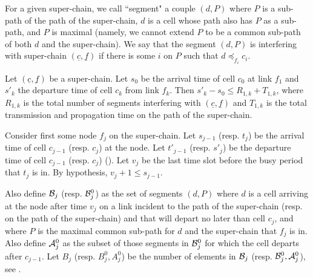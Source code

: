 \begin{definition}
For a given super-chain, we call ``segment" a couple $(d, P)$
where $P$ is a sub-path of the path of the super-chain, $d$ is a
cell whose path also has $P$ as a sub-path, and $P$ is maximal
(namely, we cannot extend $P$ to be a common sub-path of both $d$
and the super-chain). We say that the segment $(d,P)$ is
interfering with super-chain $(\underline{c},\underline{f})$ if
there is some $i$ on $P$ such that $d \preccurlyeq_{f_i} c_i$.
\end{definition}
\begin{lemma}
  Let $(\underline{c}, \underline{f})$ be
a super-chain. Let $s_0$ be the arrival time of cell $c_0$ at link
$f_1$ and  $s'_k$ the departure time of cell $c_k$ from link
$f_k$. Then $s'_k-s_0 \leq R_{1,k}+T_{1, k}$, where $R_{1,k}$ is
the total number of segments interfering with $(\underline{c},
\underline{f})$ and $T_{1, k}$ is the total transmission and
propagation time on the path of the super-chain.
\end{lemma}
\pr
Consider first some node $f_j$ on the super-chain. Let $s_{j-1}$
(resp. $t_j$) be the arrival time of cell $c_{j-1}$  (resp. $c_j$)
at the node. Let $t'_{j-1}$ (resp. $s'_j$) be the departure time
of cell $c_{j-1}$ (resp. $c_j$) (). Let $v_j$
be the last time slot before the busy period that $t_j$ is in. By
hypothesis, $v_j + 1 \leq s_{j-1}$.
\begin{figure}[!htbp]
\end{figure}
Also define $\mathcal B_j$ (resp. $\mathcal B^0_j$) as the set of segments
$(d,P)$ where $d$ is a cell arriving at the node after time $v_j$
on a link incident to the path of the super-chain (resp. on the
path of the super-chain) and that will depart no later than cell
$c_{j}$, and where $P$ is the maximal common sub-path for $d$ and
the super-chain that $f_j$ is in. Also define $\mathcal A^0_j$ as the
subset of those segments in $\mathcal B^0_j$ for which the cell departs
after $c_{j-1}$. Let $B_j$ (resp. $B^0_j, A^0_j$) be the number of
elements in $\mathcal B_j$ (resp. $\mathcal B^0_j, \mathcal A^0_j$), see
.


